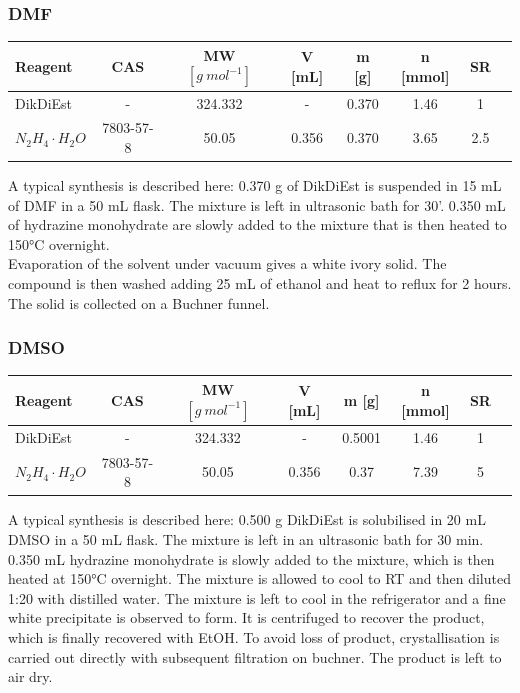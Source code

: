 \documentclass[../Master.tex]{subfiles}
\begin{document}
\subsubsection{DMF}
\begin{center}
	\begin{tabular}[b]{lccccccc}
		\toprule
		Reagent               & CAS       & MW \([g \ mol^{-1}]\) & V [mL] & m [g] & n [mmol] & SR  \\
		\midrule
		DikDiEst              & -         & 324.332               & -      & 0.370 & 1.46     & 1   \\
		\(N_2H_4 \cdot H_2O\) & 7803-57-8 & 50.05                 & 0.356  & 0.370 & 3.65     & 2.5 \\
		\bottomrule
	\end{tabular}
\end{center}
A typical synthesis is described here:
0.370 g of DikDiEst is suspended in 15 mL of DMF in a 50 mL flask. The mixture is left in ultrasonic bath for 30'. 0.350 mL of hydrazine monohydrate are slowly added to the mixture that is then heated to 150°C overnight.\\
Evaporation of the solvent under vacuum gives a white ivory solid. The compound is then washed adding 25 mL of ethanol and heat to reflux for 2 hours. The solid is collected on a Buchner funnel.
\subsubsection{DMSO}
\begin{center}
	\begin{tabular}[b]{lccccccc}
		\toprule
		Reagent               & CAS       & MW \([g \ mol^{-1}]\) & V [mL] & m [g]  & n [mmol] & SR \\
		\midrule
		DikDiEst              & -         & 324.332               & -      & 0.5001 & 1.46     & 1  \\
		\(N_2H_4 \cdot H_2O\) & 7803-57-8 & 50.05                 & 0.356  & 0.37   & 7.39     & 5  \\
		\bottomrule
	\end{tabular}
\end{center}
A typical synthesis is described here:
0.500 g DikDiEst is solubilised in 20 mL DMSO in a 50 mL flask. The mixture is left in an ultrasonic bath for 30 min. 0.350 mL hydrazine monohydrate is slowly added to the mixture, which is then heated at 150°C overnight. The mixture is allowed to cool to RT and then diluted 1:20 with distilled water. The mixture is left to cool in the refrigerator and a fine white precipitate is observed to form. It is centrifuged to recover the product, which is finally recovered with EtOH. To avoid loss of product, crystallisation is carried out directly with subsequent filtration on buchner. The product is left to air dry.
\end{document}
